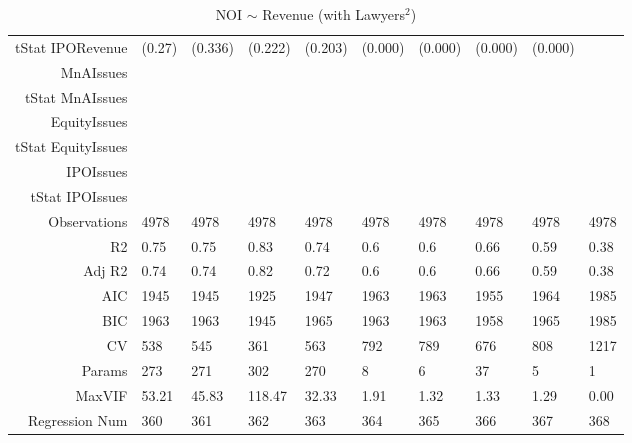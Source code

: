 \begin{table}[ht]
\begin{tabular}{rlllllllll}
  tStat IPORevenue & (0.27) & (0.336) & (0.222) & (0.203) & (0.000) & (0.000) & (0.000) & (0.000) &  \\ 
  MnAIssues &  &  &  &  &  &  &  &  &  \\ 
  tStat MnAIssues &  &  &  &  &  &  &  &  &  \\ 
  EquityIssues &  &  &  &  &  &  &  &  &  \\ 
  tStat EquityIssues &  &  &  &  &  &  &  &  &  \\ 
  IPOIssues &  &  &  &  &  &  &  &  &  \\ 
  tStat IPOIssues &  &  &  &  &  &  &  &  &  \\ 
  Observations & 4978 & 4978 & 4978 & 4978 & 4978 & 4978 & 4978 & 4978 & 4978 \\ 
  R2 & 0.75 & 0.75 & 0.83 & 0.74 & 0.6 & 0.6 & 0.66 & 0.59 & 0.38 \\ 
  Adj R2 & 0.74 & 0.74 & 0.82 & 0.72 & 0.6 & 0.6 & 0.66 & 0.59 & 0.38 \\ 
  AIC & 1945 & 1945 & 1925 & 1947 & 1963 & 1963 & 1955 & 1964 & 1985 \\ 
  BIC & 1963 & 1963 & 1945 & 1965 & 1963 & 1963 & 1958 & 1965 & 1985 \\ 
  CV & 538 & 545 & 361 & 563 & 792 & 789 & 676 & 808 & 1217 \\ 
  Params & 273 & 271 & 302 & 270 & 8 & 6 & 37 & 5 & 1 \\ 
  MaxVIF & 53.21 & 45.83 & 118.47 & 32.33 & 1.91 & 1.32 & 1.33 & 1.29 & 0.00 \\ 
  Regression Num & 360 & 361 & 362 & 363 & 364 & 365 & 366 & 367 & 368 \\ 
   \hline
\end{tabular}
\caption{NOI $\sim$ Revenue (with Lawyers$^2$)} 
\end{table}
